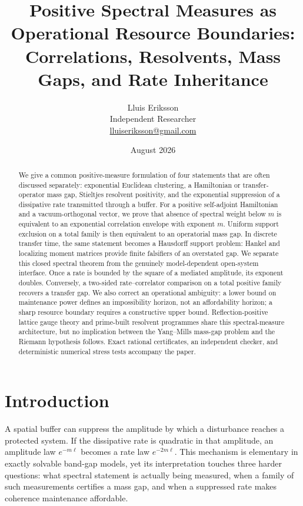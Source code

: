 \documentclass[11pt,a4paper]{article}
\title{Positive Spectral Measures as Operational Resource Boundaries:\\
Correlations, Resolvents, Mass Gaps, and Rate Inheritance}
\author{Lluis Eriksson\\Independent Researcher\\
\href{mailto:lluiseriksson@gmail.com}{lluiseriksson@gmail.com}}
\date{August 2026}
\theoremstyle{definition}
\theoremstyle{remark}
\begin{document}
\maketitle

\begin{abstract}
We give a common positive-measure formulation of four statements that are
often discussed separately: exponential Euclidean clustering, a Hamiltonian or
transfer-operator mass gap, Stieltjes resolvent positivity, and the exponential
suppression of a dissipative rate transmitted through a buffer.  For a
positive self-adjoint Hamiltonian and a vacuum-orthogonal vector, we prove that
absence of spectral weight below $m$ is equivalent to an exponential
correlation envelope with exponent $m$.  Uniform support exclusion on a total
family is then equivalent to an operatorial mass gap.  In discrete transfer
time, the same statement becomes a Hausdorff support problem: Hankel and
localizing moment matrices provide finite falsifiers of an overstated gap.  We
separate this closed spectral theorem from the genuinely model-dependent
open-system interface.  Once a rate is bounded by the square of a mediated
amplitude, its exponent doubles.  Conversely, a two-sided rate--correlator
comparison on a total positive family recovers a transfer gap.  We also correct
an operational ambiguity: a lower bound on maintenance power defines an
impossibility horizon, not an affordability horizon; a sharp resource boundary
requires a constructive upper bound.  Reflection-positive lattice gauge theory
and prime-built resolvent programmes share this spectral-measure architecture,
but no implication between the Yang--Mills mass-gap problem and the Riemann
hypothesis follows.  Exact rational certificates, an independent checker, and
deterministic numerical stress tests accompany the paper.
\end{abstract}

\section{Introduction}

A spatial buffer can suppress the amplitude by which a disturbance reaches a
protected system.  If the dissipative rate is quadratic in that amplitude, an
amplitude law $e^{-m\ell}$ becomes a rate law $e^{-2m\ell}$.  This mechanism is
elementary in exactly solvable band-gap models, yet its interpretation touches
three harder questions: what spectral statement is actually being measured,
when a family of such measurements certifies a mass gap, and when a suppressed
rate makes coherence maintenance affordable.
\end{document}
